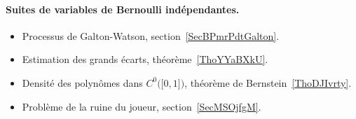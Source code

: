 \paragraph{Suites de variables de Bernoulli indépendantes.}
\begin{itemize}
	\item Processus de Galton-Watson, section~\ref{SecBPmrPdtGalton}.
	\item Estimation des grands écarts, théorème~\ref{ThoYYaBXkU}.
	\item Densité des polynômes dans \( C^0\big( \mathopen[ 0 , 1 \mathclose] \big)\), théorème de Bernstein~\ref{ThoDJIvrty}.
	\item Problème de la ruine du joueur, section~\ref{SecMSOjfgM}.
\end{itemize}
